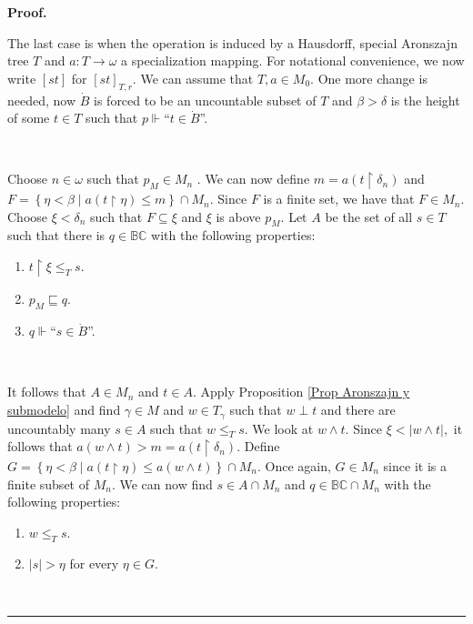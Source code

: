 \documentclass{article}
\newenvironment{proof}[1][Proof]{\noindent\textbf{#1.} }{\ \rule{0.5em}{0.5em}}
\begin{document}
\begin{proof}
\qquad\qquad\qquad\ \ \ 

The last case is when the operation is induced by a Hausdorff, special
Aronszajn tree $T$ and $a:T\longrightarrow\omega$ a specialization mapping.
For notational convenience, we now write $\left[  st\right]  $ for $\left[
st\right]  _{T,r}$. We can assume that $T,a\in M_{0}.$ One more change is
needed, now $\dot{B}$ is forced to be an uncountable subset of $T$ and
$\beta>\delta$ is the height of some $t\in T$ such that $p\Vdash
$\textquotedblleft$t\in\dot{B}$\textquotedblright.

\qquad\ \qquad\ \ \ 

Choose $n\in\omega$ such that $p_{M}\in M_{n}$ . We can now define $m=a\left(
t\upharpoonright\delta_{n}\right)  $ and $F=\left\{  \eta<\beta\mid a\left(
t\upharpoonright\eta\right)  \leq m\right\}  \cap M_{n}.$ Since $F$ is a
finite set, we have that $F\in M_{n}.$ Choose $\xi<\delta_{n}$ such that
$F\subseteq\xi$ and $\xi$ is above $p_{M}.$ Let $A$ be the set of all $s\in T$
such that there is $q\in\mathbb{BC}$ with the following properties:

\begin{enumerate}
\item $t\upharpoonright\xi\leq_{T}s.$

\item $p_{M}\sqsubseteq q.$

\item $q\Vdash$\textquotedblleft$s\in\dot{B}$\textquotedblright.
\end{enumerate}

\qquad\ \qquad\ \ \ 

It follows that $A\in M_{n}$ and $t\in A.$ Apply Proposition
\ref{Prop Aronszajn y submodelo} and find $\gamma\in M$ and $w\in T_{\gamma}$
such that $w\perp t$ and there are uncountably many $s\in A$ such that
$w\leq_{T}s.$ We look at $w\wedge t.$ Since $\xi<\left\vert w\wedge
t\right\vert ,$ it follows that $a\left(  w\wedge t\right)  >m=a\left(
t\upharpoonright\delta_{n}\right)  .$ Define $G=\left\{  \eta<\beta\mid
a\left(  t\upharpoonright\eta\right)  \leq a\left(  w\wedge t\right)
\right\}  \cap M_{n}.$ Once again, $G\in M_{n}$ since it is a finite subset of
$M_{n}.$ We can now find $s\in A\cap M_{n}$ and $q\in\mathbb{BC}\cap M_{n}$
with the following properties:

\begin{enumerate}
\item $w\leq_{T}s.$

\item $\left\vert s\right\vert >\eta$ for every $\eta\in G.$


\end{enumerate}
\end{proof}
\end{document}
